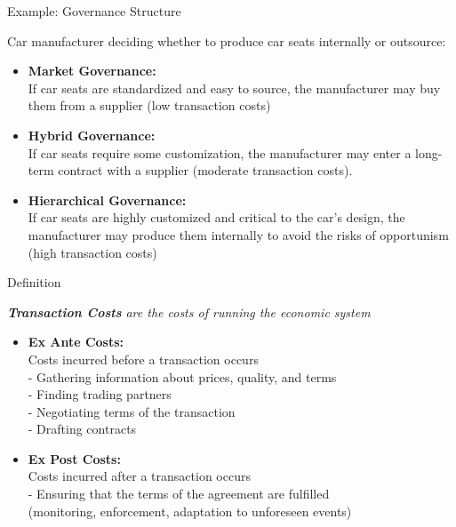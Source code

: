 \documentclass[aspectratio=169]{beamer}  %
\begin{document}
\begin{frame}{Example: Governance Structure}
\begin{spacing}{1.5}
{\small
Car manufacturer deciding whether to produce car seats internally or outsource:
\quad \\
    \begin{itemize}
        \item \textbf{ Market Governance:} \\
        If car seats are standardized and easy to source, the manufacturer may buy them from a supplier (low transaction costs)
        \item \textbf{Hybrid Governance:}\\
        If car seats require some customization, the manufacturer may enter a long-term contract with a supplier (moderate transaction costs).
        \item \textbf{Hierarchical Governance:}\\
        If car seats are highly customized and critical to the car's design, the manufacturer may produce them internally to avoid the risks of opportunism (high transaction costs)        
    \end{itemize}
}
\end{spacing}
\end{frame}


\begin{frame}{Definition }
\begin{spacing}{1.5}  
{\small
\textit{\textbf{Transaction Costs} are the costs of running the economic system}\\
    \begin{itemize}
        \item \textbf{ Ex Ante Costs:}\\
        Costs incurred before a transaction occurs\\
        - Gathering information about prices, quality, and terms\\
        - Finding trading partners\\
        - Negotiating terms of the transaction\\
        - Drafting contracts
        \item \textbf{Ex Post Costs:} \\
        Costs incurred after a transaction occurs\\
        - Ensuring that the terms of the agreement are fulfilled\\   (monitoring, enforcement, adaptation to unforeseen events)
    \end{itemize}
}
\end{spacing}
\end{frame}
\end{document}
